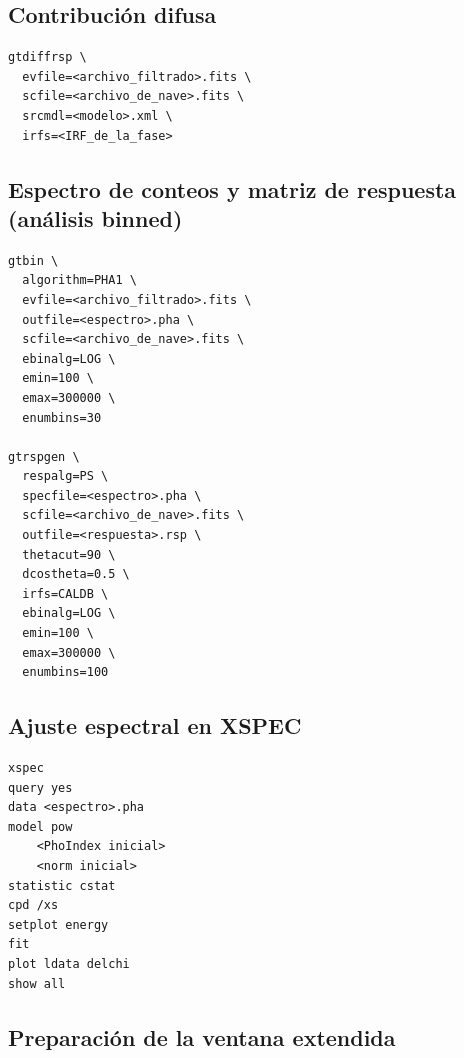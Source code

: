 \subsection{Contribución difusa}
\label{an:gtdiffrsp}

\begin{lstlisting}[style=mipython]
gtdiffrsp \
  evfile=<archivo_filtrado>.fits \
  scfile=<archivo_de_nave>.fits \
  srcmdl=<modelo>.xml \
  irfs=<IRF_de_la_fase>
\end{lstlisting}

\subsection{Espectro de conteos y matriz de respuesta (análisis binned)}
\label{an:binned}

\begin{lstlisting}[style=mipython]
gtbin \
  algorithm=PHA1 \
  evfile=<archivo_filtrado>.fits \
  outfile=<espectro>.pha \
  scfile=<archivo_de_nave>.fits \
  ebinalg=LOG \
  emin=100 \
  emax=300000 \
  enumbins=30

gtrspgen \
  respalg=PS \
  specfile=<espectro>.pha \
  scfile=<archivo_de_nave>.fits \
  outfile=<respuesta>.rsp \
  thetacut=90 \
  dcostheta=0.5 \
  irfs=CALDB \
  ebinalg=LOG \
  emin=100 \
  emax=300000 \
  enumbins=100
\end{lstlisting}

\subsection{Ajuste espectral en XSPEC}
\label{an:xspec}

\begin{lstlisting}[style=mipython]
xspec
query yes
data <espectro>.pha
model pow
    <PhoIndex inicial>
    <norm inicial>
statistic cstat
cpd /xs
setplot energy
fit
plot ldata delchi
show all
\end{lstlisting}

\subsection{Preparación de la ventana extendida}
\label{an:extendida}

